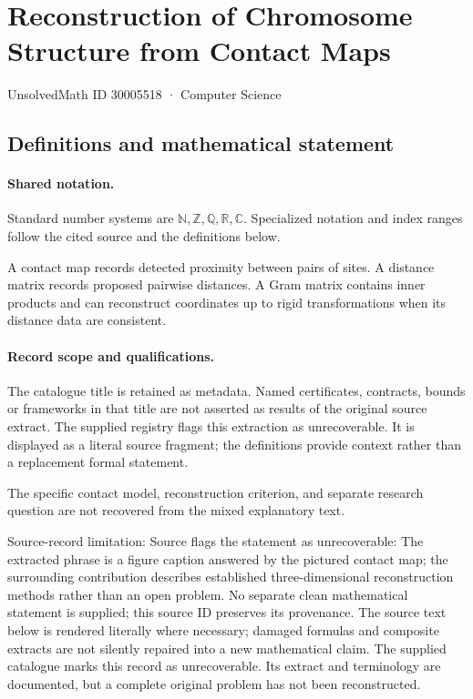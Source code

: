 \documentclass[11pt]{article}
\begin{document}
\setcounter{section}{30005517}
\section{Reconstruction of Chromosome Structure from Contact Maps}\label{30005518}
{\small\sffamily UnsolvedMath ID 30005518 · Computer Science}
\subsection{Definitions and mathematical statement}

\paragraph{Shared notation.}Standard number systems are $\mathbb N,\mathbb Z,\mathbb Q,\mathbb R,\mathbb C$. Specialized notation and index ranges follow the cited source and the definitions below.


A contact map records detected proximity between pairs of sites. A distance matrix records proposed pairwise distances. A Gram matrix contains inner products and can reconstruct coordinates up to rigid transformations when its distance data are consistent.
\paragraph{Record scope and qualifications.}
The catalogue title is retained as metadata. Named certificates, contracts, bounds or frameworks in that title are not asserted as results of the original source extract.
The supplied registry flags this extraction as unrecoverable. It is displayed as a literal source fragment; the definitions provide context rather than a replacement formal statement.

The specific contact model, reconstruction criterion, and separate research question are not recovered from the mixed explanatory text.

Source-record limitation: Source flags the statement as unrecoverable: The extracted phrase is a figure caption answered by the pictured contact map; the surrounding contribution describes established three-dimensional reconstruction methods rather than an open problem. No separate clean mathematical statement is supplied; this source ID preserves its provenance.
The source text below is rendered literally where necessary; damaged formulas and composite extracts are not silently repaired into a new mathematical claim.
The supplied catalogue marks this record as unrecoverable. Its extract and terminology are documented, but a complete original problem has not been reconstructed.
\end{document}
